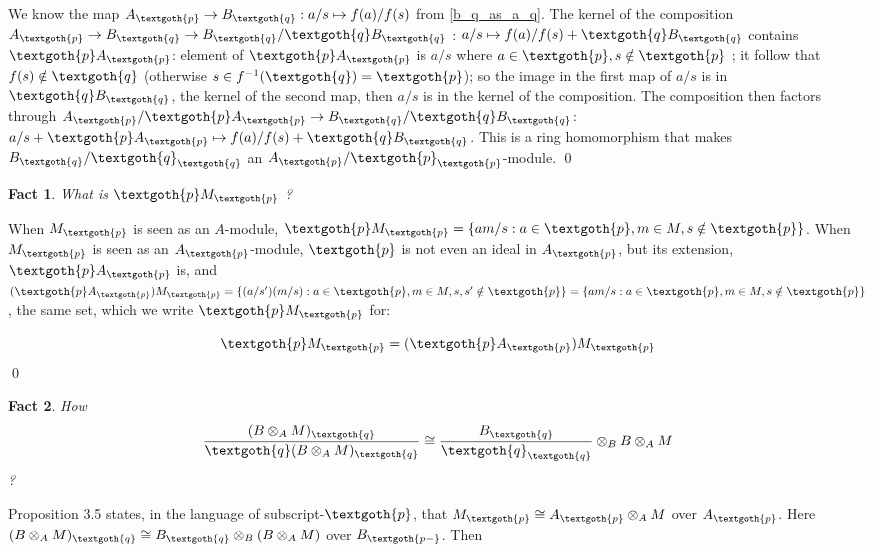 \documentclass{article}
\newtheorem{theorem}{Fact}[section]
\begin{document}
\noindent
We know the map $A_\textgoth{p} \rightarrow B_\textgoth{q} : a/s \mapsto f(a)/f(s)$ from \ref{b_q_as_a_q}.
The kernel of the composition $A_\textgoth{p} \rightarrow B_\textgoth{q} \rightarrow B_\textgoth{q} / \textgoth{q} B_\textgoth{q}$ : $a/s \mapsto f(a)/f(s) + \textgoth{q} B_\textgoth{q}$ contains $\textgoth{p} A_\textgoth{p}$: 
element of $\textgoth{p}A_\textgoth{p}$ is $a/s$ where $a \in \textgoth{p}, s \notin \textgoth{p}$ ; it follow that $f(s) \notin \textgoth{q}$ (otherwise $s \in f^{-1}(\textgoth{q}) = \textgoth{p}$); so the image in the first map of $a/s$ is in $\textgoth{q}B_\textgoth{q}$, the kernel of the second map, then $a/s$ is in the kernel of the composition.
The composition then factors through $A_\textgoth{p} / \textgoth{p} A_\textgoth{p} \rightarrow B_\textgoth{q} / \textgoth{q} B_\textgoth{q}$: $a/s + \textgoth{p} A_\textgoth{p} \mapsto f(a)/f(s) + \textgoth{q} B_\textgoth{q}$. This is a ring homomorphism that makes $B_\textgoth{q} / \textgoth{q}_\textgoth{q}$ an $A_\textgoth{p} / \textgoth{p}_\textgoth{p}$-module.
\qed

\bigskip
\begin{theorem}
What is $\textgoth{p} M_\textgoth{p}$ ?
\end{theorem}

\noindent
When $M_\textgoth{p}$ is seen as an $A$-module, $\textgoth{p} M_\textgoth{p} = \{am/s: a \in \textgoth{p}, m \in M, s \notin \textgoth{p} \}$. When $M_\textgoth{p}$ is seen as an $A_\textgoth{p}$-module, $\textgoth{p}$ is not even an ideal in $A_\textgoth{p}$, but its extension, $\textgoth{p} A_\textgoth{p}$ is, and $(\textgoth{p} A_\textgoth{p}) M_\textgoth{p} = \{(a/s')(m/s): a \in \textgoth{p}, m \in M, s, s' \notin \textgoth{p} \} = \{am/s: a \in \textgoth{p}, m \in M, s \notin \textgoth{p} \}$, the same set, which we write $\textgoth{p} M_\textgoth{p}$ for:

\[
  \textgoth{p} M_\textgoth{p} = (\textgoth{p} A_\textgoth{p}) M_\textgoth{p}
\]
\qed

\bigskip
\begin{theorem}
How
\[
\frac{(B \otimes_A M)_\textgoth{q}}{\textgoth{q} (B \otimes_A M)_\textgoth{q}} 
\cong
\frac{B_\textgoth{q}}{\textgoth{q}_\textgoth{q}} \otimes_B B \otimes_A M
\]
?
\end{theorem}

\noindent
Proposition 3.5 states, in the language of subscript-$\textgoth{p}$, that $M_\textgoth{p} \cong A_\textgoth{p} \otimes_A M$ over $A_\textgoth{p}$. Here $(B \otimes_
A M)_\textgoth{q} \cong B_\textgoth{q} \otimes_B (B \otimes_A M)$ over $B_\textgoth{p-}$. Then
\end{document}
